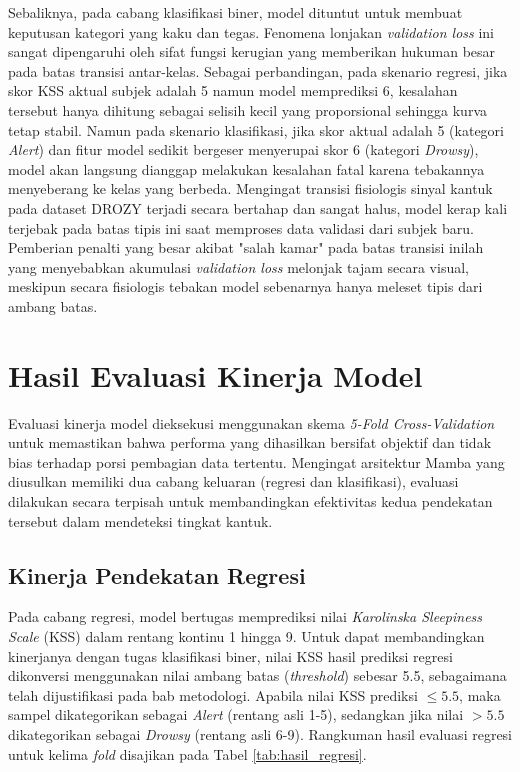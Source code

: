 Sebaliknya, pada cabang klasifikasi biner, model dituntut untuk membuat keputusan kategori yang kaku dan tegas. Fenomena lonjakan \textit{validation loss} ini sangat dipengaruhi oleh sifat fungsi kerugian yang memberikan hukuman besar pada batas transisi antar-kelas. Sebagai perbandingan, pada skenario regresi, jika skor KSS aktual subjek adalah 5 namun model memprediksi 6, kesalahan tersebut hanya dihitung sebagai selisih kecil yang proporsional sehingga kurva tetap stabil. Namun pada skenario klasifikasi, jika skor aktual adalah 5 (kategori \textit{Alert}) dan fitur model sedikit bergeser menyerupai skor 6 (kategori \textit{Drowsy}), model akan langsung dianggap melakukan kesalahan fatal karena tebakannya menyeberang ke kelas yang berbeda. Mengingat transisi fisiologis sinyal kantuk pada dataset DROZY terjadi secara bertahap dan sangat halus, model kerap kali terjebak pada batas tipis ini saat memproses data validasi dari subjek baru. Pemberian penalti yang besar akibat "salah kamar" pada batas transisi inilah yang menyebabkan akumulasi \textit{validation loss} melonjak tajam secara visual, meskipun secara fisiologis tebakan model sebenarnya hanya meleset tipis dari ambang batas.

\section{Hasil Evaluasi Kinerja Model} \label{IV.Hasil_Uji}
Evaluasi kinerja model dieksekusi menggunakan skema \textit{5-Fold Cross-Validation} untuk memastikan bahwa performa yang dihasilkan bersifat objektif dan tidak bias terhadap porsi pembagian data tertentu. Mengingat arsitektur Mamba yang diusulkan memiliki dua cabang keluaran (regresi dan klasifikasi), evaluasi dilakukan secara terpisah untuk membandingkan efektivitas kedua pendekatan tersebut dalam mendeteksi tingkat kantuk.

\subsection{Kinerja Pendekatan Regresi}
Pada cabang regresi, model bertugas memprediksi nilai \textit{Karolinska Sleepiness Scale} (KSS) dalam rentang kontinu 1 hingga 9. Untuk dapat membandingkan kinerjanya dengan tugas klasifikasi biner, nilai KSS hasil prediksi regresi dikonversi menggunakan nilai ambang batas (\textit{threshold}) sebesar 5.5, sebagaimana telah dijustifikasi pada bab metodologi. Apabila nilai KSS prediksi $\leq 5.5$, maka sampel dikategorikan sebagai \textit{Alert} (rentang asli 1-5), sedangkan jika nilai $> 5.5$ dikategorikan sebagai \textit{Drowsy} (rentang asli 6-9). Rangkuman hasil evaluasi regresi untuk kelima \textit{fold} disajikan pada Tabel \ref{tab:hasil_regresi}.

